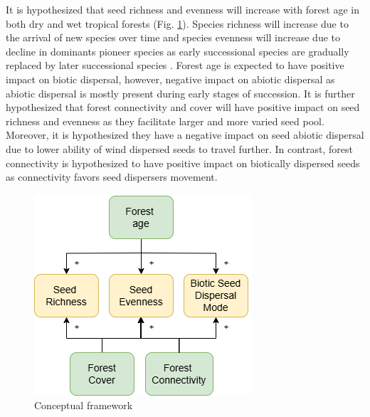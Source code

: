 It is hypothesized that seed richness and evenness will increase with forest age in both dry and wet tropical forests (Fig. \ref{fig:cf}). Species richness will increase due to the arrival of new species over time and species evenness will increase due to decline in dominants pioneer species as early successional species are gradually replaced by later successional species \citep{poorterSuccessionalTheories2023, chazdonNaturalRegenerationTool2016}. Forest age is expected to have positive impact on biotic dispersal, however, negative impact on abiotic dispersal as abiotic dispersal is mostly present during early stages of succession. It is further hypothesized that forest connectivity and cover will have positive impact on seed richness and evenness as they facilitate larger and more varied seed pool. Moreover, it is hypothesized they have a negative impact on seed abiotic dispersal due to lower ability of wind dispersed seeds to travel further. In contrast, forest connectivity is hypothesized to have positive impact on biotically dispersed seeds as connectivity favors seed dispersers movement. 



\begin{figure}[]
\begin{center}
		\includegraphics[]{Proposal/graphics/contextual_framework.drawio.png}
	\caption{Conceptual framework}
\label{fig:cf}
\end{center}
\end{figure}
